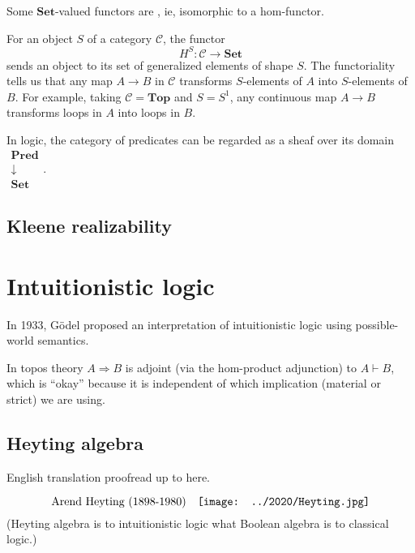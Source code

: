 Some $\mathbf{Set}$-valued functors are , ie, isomorphic to a hom-functor.

For an object $S$ of a category $\mathcal{C}$, the functor
\begin{equation}
H^S : \mathcal{C} \rightarrow \mathbf{Set}
\end{equation}
sends an object to its set of generalized elements of shape $S$.  The functoriality tells us that any map $A \rightarrow B$ in $\mathcal{C}$ transforms $S$-elements of $A$ into $S$-elements of $B$.  For example, taking $\mathcal{C} = \mathbf{Top}$ and $S = S^1$, any continuous map $A \rightarrow B$ transforms loops in $A$ into loops in $B$.

In logic, the category of predicates can be regarded as a sheaf over its domain $\mathrel{\substack{\mathbf{Pred}\\\downarrow\\\mathbf{Set}}}$.


\subsection{Kleene realizability}

\underconst

\section{Intuitionistic logic}

In 1933, G\"{o}del proposed an interpretation of intuitionistic logic using possible-world semantics.

In topos theory $A \Rightarrow B$ is adjoint (via the hom-product adjunction) to $A \vdash B$, which is ``okay'' because it is independent of which implication (material or strict) we are using.

\subsection{Heyting algebra}

{\color{red} English translation proofread up to here.}

\begin{equation}
\mbox{Arend Heyting (1898-1980)} \quad 
\vcenter{\hbox{\texttt{[image: ../2020/Heyting.jpg]}}}
\end{equation}
(Heyting algebra is to intuitionistic logic what Boolean algebra is to classical logic.)

